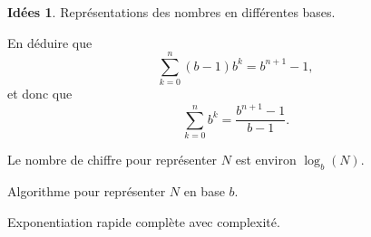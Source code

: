 \documentclass[a4paper,12pt, notitlepage]{article}
\theoremstyle{definition}
\newtheorem{idee}{Idées}
\begin{document}
\begin{idee}
	Représentations des nombres en différentes bases.
	
	En déduire que 
		\[ \sum_{k=0}^{n} (b-1)b^k = b^{n+1} - 1, \]
	et donc que 
		\[ \sum_{k=0}^n b^k = \dfrac{b^{n+1} - 1}{b-1}. \]
	
	Le nombre de chiffre pour représenter $N$ est environ $\log_b(N)$. 
	
	Algorithme pour représenter $N$ en base $b$.
	
	Exponentiation rapide complète avec complexité.
\end{idee}
\end{document}
